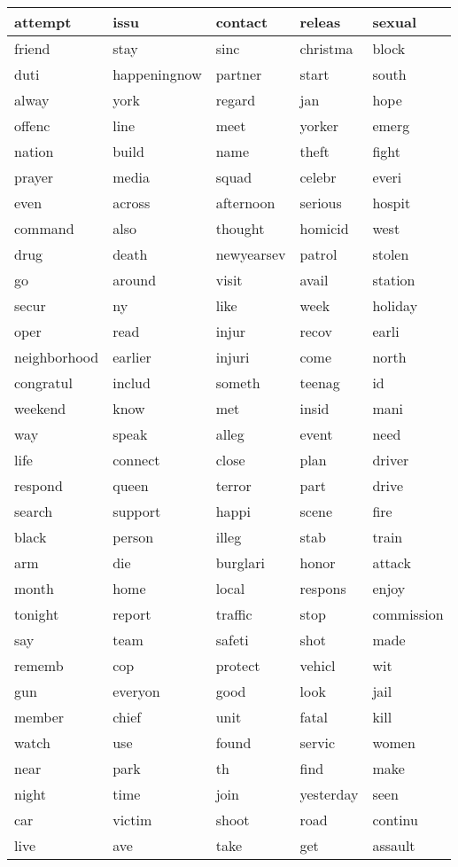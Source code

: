 \begin{longtable}{p{2.5cm}p{2.5cm}p{2.5cm}p{2.5cm}p{2.5cm}}
attempt&issu&contact&releas&sexual\\ \hline 
friend&stay&sinc&christma&block\\ \hline 
duti&happeningnow&partner&start&south\\ \hline 
alway&york&regard&jan&hope\\ \hline 
offenc&line&meet&yorker&emerg\\ \hline 
nation&build&name&theft&fight\\ \hline 
prayer&media&squad&celebr&everi\\ \hline 
even&across&afternoon&serious&hospit\\ \hline 
command&also&thought&homicid&west\\ \hline 
drug&death&newyearsev&patrol&stolen\\ \hline 
go&around&visit&avail&station\\ \hline 
secur&ny&like&week&holiday\\ \hline 
oper&read&injur&recov&earli\\ \hline 
neighborhood&earlier&injuri&come&north\\ \hline 
congratul&includ&someth&teenag&id\\ \hline 
weekend&know&met&insid&mani\\ \hline 
way&speak&alleg&event&need\\ \hline 
life&connect&close&plan&driver\\ \hline 
respond&queen&terror&part&drive\\ \hline 
search&support&happi&scene&fire\\ \hline 
black&person&illeg&stab&train\\ \hline 
arm&die&burglari&honor&attack\\ \hline 
month&home&local&respons&enjoy\\ \hline 
tonight&report&traffic&stop&commission\\ \hline 
say&team&safeti&shot&made\\ \hline 
rememb&cop&protect&vehicl&wit\\ \hline 
gun&everyon&good&look&jail\\ \hline 
member&chief&unit&fatal&kill\\ \hline 
watch&use&found&servic&women\\ \hline 
near&park&th&find&make\\ \hline 
night&time&join&yesterday&seen\\ \hline 
car&victim&shoot&road&continu\\ \hline 
live&ave&take&get&assault\\ \hline 

\end{longtable}
